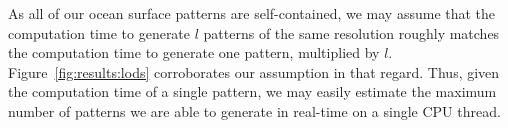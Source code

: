 As all of our ocean surface patterns are self-contained, we may assume
that the computation time to generate $l$ patterns of the same resolution
roughly matches the computation time to generate one pattern, multiplied by
$l$. Figure~\ref{fig:results:lods} corroborates our assumption in that regard.
Thus, given the computation time of a single pattern, we may easily estimate
the maximum number of patterns we are able to generate in real-time on a
single CPU thread.
%


%


